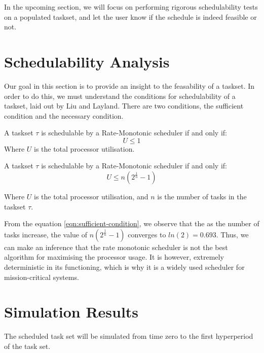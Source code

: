 In the upcoming section, we will focus on performing rigorous schedulability tests on a populated taskset, and let the user know if the schedule is indeed feasible or not.

\section{Schedulability Analysis}\label{sec:sched-analysis}

Our goal in this section is to provide an insight to the feasability of a taskset. In order to do this, we must understand the conditions for schedulability of a taskset, laid out by Liu and Layland\cite{liu-layland}. There are two conditions, the sufficient condition and the necessary condition.\\

\begin{tcolorbox}[title=Necessary Scheduling Condition]
A taskset $\tau$ is schedulable by a Rate-Monotonic scheduler if and only if:
\begin{equation}
  U \leq 1
\end{equation}
Where $U$ is the total processor utilisation.
\end{tcolorbox}

\begin{tcolorbox}[title=Sufficient Scheduling Condition]
A taskset $\tau$ is schedulable by a Rate-Monotonic scheduler if and only if:
\begin{equation}\label{eqn:sufficient-condition}
  U \leq n({2}^{\frac{1}{n}} - 1)
\end{equation}

Where $U$ is the total processor utilisation, and $n$ is the number of tasks in the taskset $\tau$.
\end{tcolorbox}

From the equation \ref{eqn:sufficient-condition}, we observe that the as the number of tasks increase, the value of $n({2}^{\frac{1}{n}} - 1)$ converges to $ln(2) = 0.693$. Thus, we can make an inference that the rate monotonic scheduler is not the best algorithm for maximising the processor usage. It is however, extremely deterministic in its functioning, which is why it is a widely used scheduler for mission-critical systems.

\section{Simulation Results}\label{sec:sim-results}
The scheduled task set will be simulated from time zero to the first hyperperiod of the task set.
